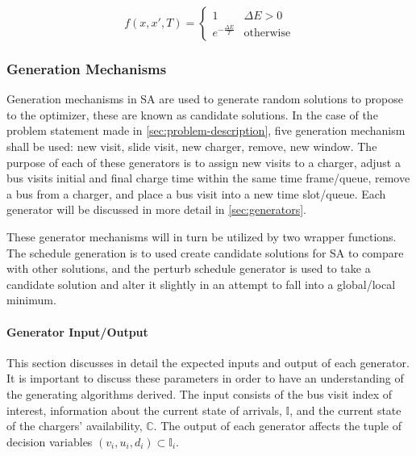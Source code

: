 \documentclass[ee,msthesis]{usuthesis}
\newcommand{\I}{\mathbb{I}}                 %
\newcommand{\C}{\mathbb{C}}                 %
\begin{document}
\begin{equation}
\label{eq:candaccept}
f(x,x',T) =
\begin{cases}
  1                 & \Delta E > 0 \\
  e^{- \frac{\Delta E}{T}} & \text{otherwise}
\end{cases}
\end{equation}

\subsubsection{Generation Mechanisms}
\label{sec:generation-mechanisms}
Generation mechanisms in SA are used to generate random solutions to propose to the optimizer, these are known as
candidate solutions. In the case of the problem statement made in \ref{sec:problem-description}, five generation mechanism
shall be used: new visit, slide visit, new charger, remove, new window. The purpose of each of these generators is to
assign new visits to a charger, adjust a bus visits initial and final charge time within the same time frame/queue,
remove a bus from a charger, and place a bus visit into a new time slot/queue. Each generator will be discussed in more
detail in \ref{sec:generators}.

These generator mechanisms will in turn be utilized by two wrapper functions. The schedule generation is to used create
candidate solutions for SA to compare with other solutions, and the perturb schedule generator is used to take a
candidate solution and alter it slightly in an attempt to fall into a global/local minimum.

\paragraph{Generator Input/Output}
\label{sec:generator-input-output}
This section discusses in detail the expected inputs and output of each generator. It is important to discuss these
parameters in order to have an understanding of the generating algorithms derived. The input consists of the bus visit
index of interest, information about the current state of arrivals, \(\I\), and the current state of the chargers'
availability, \(\C\). The output of each generator affects the tuple of decision variables \((v_i, u_i, d_i) \subset \I_i\).
\end{document}
